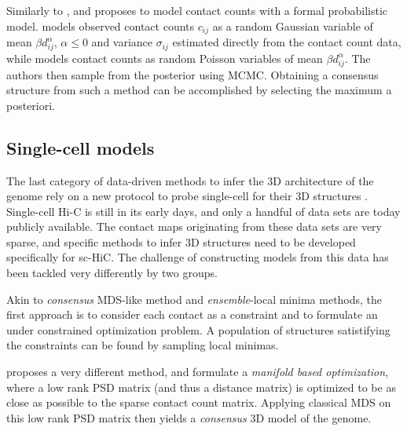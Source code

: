 \documentclass[letterpaper,12pt]{article}
\begin{document}
Similarly to \citet{varoquaux:statistical}, \citet{rousseau:three} and
\citet{hu:bayesian} proposes to model contact counts with a formal
probabilistic model. \citet{rousseau:three} models observed contact counts
$c_{ij}$ as a random Gaussian variable of mean $\beta d_{ij}^{\alpha}$,
$\alpha \leq 0$ and variance $\sigma_{ij}$ estimated directly from the contact
count data, while \citet{hu:bayesian} models contact counts as random Poisson
variables of mean $\beta d_{ij}^\alpha$. The authors then sample from the
posterior using MCMC. Obtaining a consensus structure from such a method can
be accomplished by selecting the maximum a posteriori.

\subsection*{Single-cell models}

The last category of data-driven methods to infer the 3D architecture of the
genome rely on a new protocol to probe single-cell for their 3D structures
\citep{nagano:single-cell,ramani:massively}. Single-cell Hi-C is still in its early days,
and only a handful of data sets are today publicly available. The contact maps
originating from these data sets are very sparse, and specific methods to
infer 3D structures need to be developed specifically for sc-HiC. The
challenge of constructing models from this data has been tackled very
differently by two groups. 

Akin to {\em consensus} MDS-like method and {\em ensemble}-local minima
methods,  the first approach is to consider each contact as a constraint and
to formulate an under constrained optimization problem. A population of
structures satistifying the constraints can be found by sampling local
minimas.

\citet{paulsen:manifold} proposes a very different method, and formulate a
\textit{manifold based optimization}, where a low rank PSD matrix (and thus a
distance matrix) is optimized to be as close as possible to the sparse contact
count matrix. Applying classical MDS on this low rank PSD matrix then yields a
\textit{consensus} 3D model of the genome.
\end{document}
